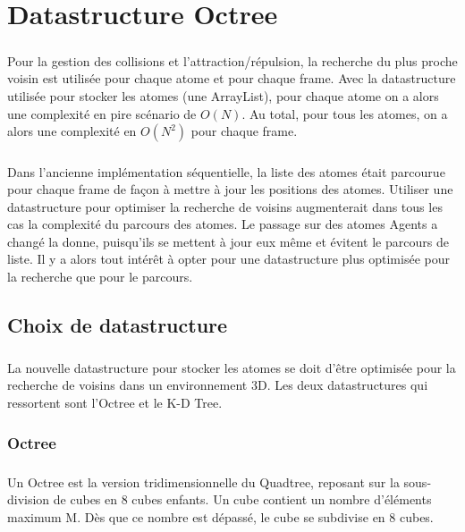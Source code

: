 \chapter{Datastructure Octree}
\label{mise_en_oeuvre}

\paragraph{}
Pour la gestion des collisions et l'attraction/répulsion, la recherche du plus
proche voisin est utilisée pour chaque atome et pour chaque frame. Avec la
datastructure utilisée pour stocker les atomes (une ArrayList), pour chaque
atome on a alors une complexité en pire scénario de $O(N)$. Au total, pour tous
les atomes, on a alors une complexité en $O(N^2)$ pour chaque frame.

\paragraph{}
Dans l'ancienne implémentation séquentielle, la liste des atomes était
parcourue pour chaque frame de façon à mettre à jour les positions des atomes.
Utiliser une datastructure pour optimiser la recherche de voisins augmenterait
dans tous les cas la complexité du parcours des atomes. Le passage sur des
atomes Agents a changé la donne, puisqu'ils se mettent à jour eux même et
évitent le parcours de liste. Il y a alors tout intérêt à opter pour une
datastructure plus optimisée pour la recherche que pour le parcours.


\section{Choix de datastructure}

\paragraph{}
La nouvelle datastructure pour stocker les atomes se doit d'être optimisée pour
la recherche de voisins dans un environnement 3D. Les deux datastructures qui
ressortent sont l'Octree et le K-D Tree.

\subsection{Octree}

\paragraph{}
Un Octree est la version tridimensionnelle du Quadtree, reposant sur la
sous-division de cubes en 8 cubes enfants. Un cube contient un nombre
d'éléments maximum M. Dès que ce nombre est dépassé, le cube se subdivise en 8
cubes.

